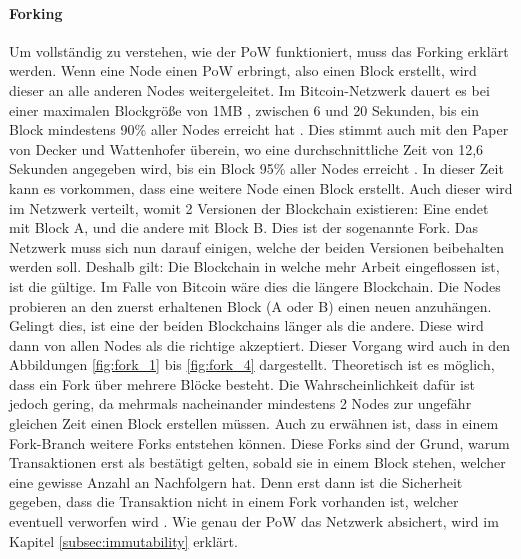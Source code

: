 \paragraph{Forking}
Um vollständig zu verstehen, wie der PoW funktioniert, muss das Forking erklärt werden. Wenn eine Node einen PoW erbringt, also einen Block erstellt, wird dieser an alle anderen Nodes weitergeleitet. Im Bitcoin-Netzwerk dauert es bei einer maximalen Blockgröße von 1MB \cite{AntonopoulosMasteringbitcoin2015}, zwischen 6 und 20 Sekunden, bis ein Block mindestens 90\% aller Nodes erreicht hat \cite{BitcoinStatsBitcoinPropagationData}. Dies stimmt auch mit den Paper von Decker und Wattenhofer überein, wo eine durchschnittliche Zeit von 12,6 Sekunden angegeben wird, bis ein Block 95\% aller Nodes erreicht \cite{DeckerInformationpropagationbitcoin2013}. In dieser Zeit kann es vorkommen, dass eine weitere Node einen Block erstellt. Auch dieser wird im Netzwerk verteilt, womit 2 Versionen der Blockchain existieren: Eine endet mit Block A, und die andere mit Block B. Dies ist der sogenannte Fork. Das Netzwerk muss sich nun darauf einigen, welche der beiden Versionen beibehalten werden soll. Deshalb gilt: Die Blockchain in welche mehr Arbeit eingeflossen ist, ist die gültige. Im Falle von Bitcoin wäre dies die längere Blockchain. Die Nodes probieren an den zuerst erhaltenen Block (A oder B) einen neuen anzuhängen. Gelingt dies, ist eine der beiden Blockchains länger als die andere. Diese wird dann von allen Nodes als die richtige akzeptiert. Dieser Vorgang wird auch in den Abbildungen \ref{fig:fork_1} bis \ref{fig:fork_4} dargestellt. Theoretisch ist es möglich, dass ein Fork über mehrere Blöcke besteht. Die Wahrscheinlichkeit dafür ist jedoch gering, da mehrmals nacheinander mindestens 2 Nodes zur ungefähr gleichen Zeit einen Block erstellen müssen. Auch zu erwähnen ist, dass in einem Fork-Branch weitere Forks entstehen können. Diese Forks sind der Grund, warum Transaktionen erst als bestätigt gelten, sobald sie in einem Block stehen, welcher eine gewisse Anzahl an Nachfolgern hat. Denn erst dann ist die Sicherheit gegeben, dass die Transaktion nicht in einem Fork vorhanden ist, welcher eventuell verworfen wird \cite{AntonopoulosMasteringbitcoin2015}. Wie genau der PoW das Netzwerk absichert, wird im Kapitel \ref{subsec:immutability} erklärt.

